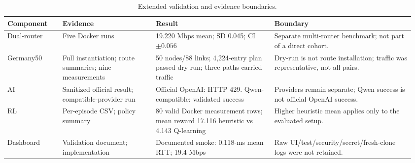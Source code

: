 \begin{table}[t]
\caption{Extended validation and evidence boundaries.}
\label{tab:extended-validation}
\centering
\setlength{\tabcolsep}{1.5pt}
\begin{tabular}{p{0.13\linewidth}p{0.22\linewidth}p{0.28\linewidth}p{0.33\linewidth}}
\hline
Component & Evidence & Result & Boundary \\
\hline
Dual-router & Five Docker runs & 19.220 Mbps mean; SD 0.045; CI $\pm0.056$ & Separate multi-router benchmark; not part of a direct cohort. \\
Germany50 & Full instantiation; route summaries; nine measurements & 50 nodes/88 links; 4,224-entry plan passed dry-run; three paths carried traffic & Dry-run is not route installation; traffic was representative, not all-pairs. \\
AI & Sanitized official result; compatible-provider run & Official OpenAI: HTTP 429. Qwen-compatible: validated success & Providers remain separate; Qwen success is not official OpenAI success. \\
RL & Per-episode CSV; policy summary & 80 valid Docker measurement rows; mean reward 17.116 heuristic vs 4.143 Q-learning & Higher heuristic mean applies only to the evaluated setup. \\
Dashboard & Validation document; implementation & Documented smoke: 0.118-ms mean RTT; 19.4 Mbps & Raw UI/test/security/secret/fresh-clone logs were not retained. \\
\hline
\end{tabular}
\end{table}
